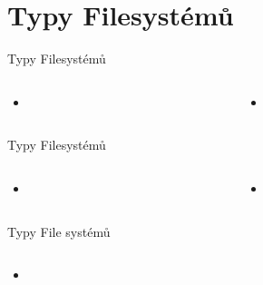 \documentclass[aspectratio=169,xcolor=dvipsnames, t]{beamer}
\begin{document}
{\section{Typy Filesystémů}
\begin{frame}{Typy Filesystémů}
    \begin{columns}
    \begin{column}{0.45\textwidth}
        \begin{itemize}
            \item 
        \end{itemize}
    \end{column}
    \begin{column}{0.45\textwidth}  %
        \begin{itemize}
            \item 
        \end{itemize}
    \end{column}
    \end{columns}
\end{frame}
\begin{frame}{Typy Filesystémů}
    \begin{columns}
    \begin{column}{0.45\textwidth}
        \begin{itemize}
            \item 
        \end{itemize}
    \end{column}
    \begin{column}{0.45\textwidth}  %
        \begin{itemize}
            \item 
        \end{itemize}
    \end{column}
    \end{columns}
\end{frame}
\begin{frame}{Typy File systémů}
    \begin{columns}
    \begin{column}{0.45\textwidth}
        \begin{itemize}
            \item 
        \end{itemize}
    \end{column}
    \begin{column}{0.45\textwidth}  %

\end{column}
\end{columns}
\end{frame}}
\end{document}
